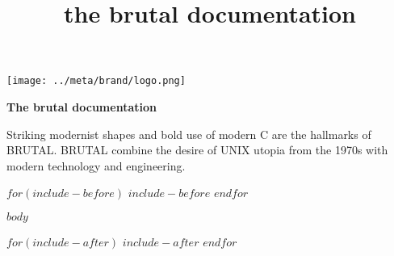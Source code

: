 \documentclass{book}
\title{\bigskip \bigskip the brutal documentation}
\begin{document}
    \begin{titlepage}
        \centering
        \texttt{[image: ../meta/brand/logo.png]}

        \vfill

        {\bfseries\Large
            The brutal documentation\\  
        }

        Striking modernist shapes and bold use of modern C are the hallmarks of BRUTAL.
        BRUTAL combine the desire of UNIX utopia from the 1970s with modern technology and engineering.
    \end{titlepage}

    \tableofcontents

    \newpage

$for(include-before)$
$include-before$
$endfor$

$body$

$for(include-after)$
$include-after$
$endfor$
\end{document}
